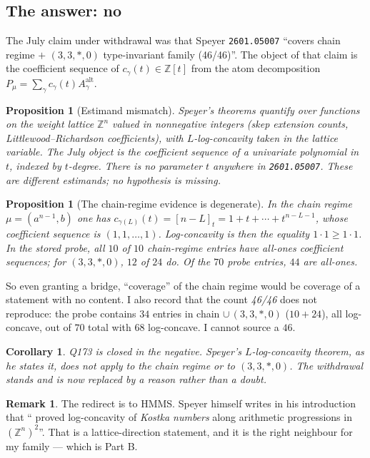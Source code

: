 \documentclass[11pt]{article}
\newtheorem{proposition}[theorem]{Proposition}
\newtheorem{corollary}[theorem]{Corollary}
\theoremstyle{definition}
\newtheorem{remark}[theorem]{Remark}
\newcommand{\Z}{\mathbb{Z}}
\begin{document}
\subsection{The answer: no}

The July claim under withdrawal was that Speyer \texttt{2601.05007} ``covers chain regime
$+$ $(3,3,\ast,0)$ type-invariant family (46/46)''. The object of that claim is the
coefficient sequence of $c_\gamma(t)\in\Z[t]$ from the atom decomposition
$P_\mu=\sum_\gamma c_\gamma(t)A^{\mathrm{alt}}_\gamma$.

\begin{proposition}[Estimand mismatch]\label{prop:estimand}
Speyer's theorems quantify over functions on the weight lattice $\Z^n$ valued in
nonnegative integers (skep extension counts, Littlewood--Richardson coefficients), with
$L$-log-concavity taken in the \emph{lattice} variable. The July object is the
coefficient sequence of a univariate polynomial in $t$, indexed by \emph{$t$-degree}.
There is no parameter $t$ anywhere in \texttt{2601.05007}. These are different estimands;
no hypothesis is missing.
\end{proposition}

\begin{proposition}[The chain-regime evidence is degenerate]\label{prop:degenerate}
In the chain regime $\mu=(a^{n-1},b)$ one has $c_{\gamma(L)}(t)=[n-L]_t=1+t+\cdots+t^{n-L-1}$,
whose coefficient sequence is $(1,1,\dots,1)$. Log-concavity is then the \emph{equality}
$1\cdot1\ge1\cdot1$. In the stored probe, all $10$ of $10$ chain-regime entries have
all-ones coefficient sequences; for $(3,3,\ast,0)$, $12$ of $24$ do. Of the $70$ probe
entries, $44$ are all-ones.
\end{proposition}

So even granting a bridge, ``coverage'' of the chain regime would be coverage of a
statement with no content. I also record that the count \emph{46/46} does not reproduce:
the probe contains $34$ entries in chain $\cup\,(3,3,\ast,0)$ ($10+24$), all log-concave,
out of $70$ total with $68$ log-concave. I cannot source a $46$.

\begin{corollary}
Q173 is closed in the negative. Speyer's $L$-log-concavity theorem, as he states it, does
not apply to the chain regime or to $(3,3,\ast,0)$. The withdrawal stands and is now
replaced by a reason rather than a doubt.
\end{corollary}

\begin{remark}
The redirect is to HMMS. Speyer himself writes in his introduction that
``\cite{HMMS} proved log-concavity of \emph{Kostka numbers} along arithmetic progressions
in $(\Z^n)^2$''. That is a lattice-direction statement, and it is the right neighbour for
my family --- which is Part B.
\end{remark}
\end{document}
